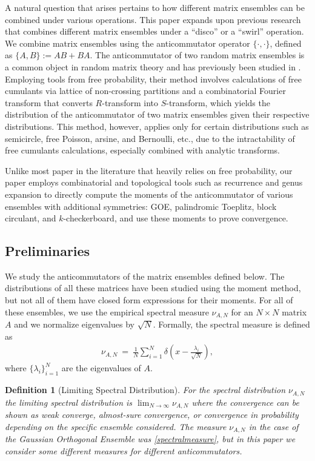 \documentclass[11pt,reqno]{amsart}
\numberwithin{equation}{section}
\theoremstyle{plain}
\newtheorem{definition}[thm]{Definition}
\begin{document}
A natural question that arises pertains to how different matrix ensembles can be combined under various operations. This paper expands upon previous research \cite{disco,Swirl} that combines different matrix ensembles under a ``disco'' or a ``swirl'' operation. We combine matrix ensembles using the anticommutator operator $\{\cdot, \cdot\}$, defined as $\{A, B\}:=AB+BA$. The anticommutator of two random matrix ensembles is a common object in random matrix theory and has previously been studied in \cite{commutator}. Employing tools from free probability, their method involves calculations of free cumulants via lattice of non-crossing partitions and a combinatorial Fourier transform that converts $R$-transform into $S$-transform, which yields the distribution of the anticommutator of two matrix ensembles given their respective distributions. This method, however, applies only for certain distributions such as semicircle, free Poisson, arsine, and Bernoulli, etc., due to the intractability of free cumulants calculations, especially combined with analytic transforms.

Unlike most paper in the literature that heavily relies on free probability, our paper employs combinatorial and topological tools such as recurrence and genus expansion to directly compute the moments of the anticommutator of various ensembles with additional symmetries: GOE, palindromic Toeplitz, block circulant, and $k$-checkerboard, and use these moments to prove convergence.


\subsection{Preliminaries}

We study the anticommutators of the matrix ensembles defined below. The distributions of all these matrices have been studied using the moment method, but not all of them have closed form expressions for their moments. For all of these ensembles, we use the empirical spectral measure $\nu_{A,N}$ for an $N\times N$ matrix $A$ and we normalize eigenvalues by $\sqrt{N}$. Formally, the spectral measure is defined as
\begin{align}\label{spectralmeasure}
\nu_{A,N} \ = \ \frac{1}{N}\sum_{i=1}^N\delta\left(x-\frac{\lambda_i}{\sqrt{N}}\right),
\end{align}
where $\{\lambda_i\}_{i=1}^N$ are the eigenvalues of $A$.

\begin{definition}[Limiting Spectral Distribution]
For the spectral distribution $\nu_{A,N}$ the limiting spectral distribution is $\lim_{N\to\infty}\nu_{A,N}$ where the convergence can be shown as weak converge, almost-sure convergence, or convergence in probability depending on the specific ensemble considered. The measure $\nu_{A,N}$ in the case of the Gaussian Orthogonal Ensemble was \eqref{spectralmeasure}, but in this paper we consider some different measures for different anticommutators.
\end{definition}
\end{document}
